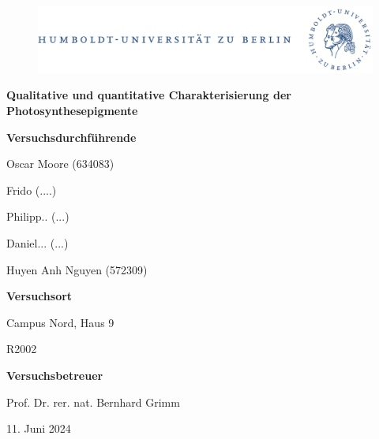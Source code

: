 \documentclass[10pt,a4paper]{article}
\begin{document}
	
	\begin{titlepage}
		\begin{center}
			\begin{figure}[h!tbp]
				\includegraphics[width=\linewidth]{HUlogo.PNG}
			\end{figure}
			\vspace*{0.5cm}
			
			\textcolor{Bluetitle}{\textbf{\huge Qualitative und quantitative Charakterisierung
					der Photosynthesepigmente}}\par
			
			\vspace*{1.4cm}
			
			\textcolor{Greyish}{\textbf{Versuchsdurchführende}}\par
			\textcolor{Greyish}{Oscar Moore (634083)}\par
			\textcolor{Greyish}{Frido (....)}\par
			\textcolor{Greyish}{Philipp.. (...)}\par
			\textcolor{Greyish}{Daniel... (...)}\par
			\textcolor{Greyish}{Huyen Anh Nguyen (572309)}\par
			\vspace*{0.5cm}
			\textcolor{Greyish}{\textbf{Versuchsort}}\par
			\textcolor{Greyish}{Campus Nord, Haus 9}\par
			\textcolor{Greyish}{R2002}\par
			\vspace*{0.5cm}
			\textcolor{Greyish}{\textbf{Versuchsbetreuer}}\par
			\textcolor{Greyish}{Prof. Dr. rer. nat. Bernhard Grimm}\par
			
			\vspace*{1.0 cm}
			
			\textcolor{Greyish}{11. Juni 2024}\par
			
			\vspace*{1.0 cm}
			
			
		\end{center}
		
		\tableofcontents
		
	\end{titlepage}
	
\end{document}
